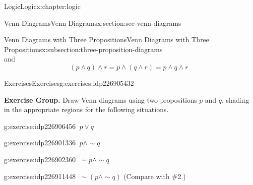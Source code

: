 \documentclass[twoside,10pt,]{book}
\numberwithin{equation}{section}
\begin{document}
\begin{chapterptx}{Logic}{}{Logic}{}{}{x:chapter:logic}
\begin{sectionptx}{Venn Diagrams}{}{Venn Diagrams}{}{}{x:section:sec-venn-diagrams}
\begin{subsectionptx}{Venn Diagrams with Three Propositions}{}{Venn Diagrams with Three Propositions}{}{}{x:subsection:three-proposition-diagrams}
\begin{equation*}
\end{equation*}
and%
\begin{equation*}
(p{\wedge} q){\wedge} r=p{\wedge}(q{\wedge} r)=p{\wedge} q{\wedge} r
\end{equation*}
%
\par
\begin{sidebyside}{2}{0.1}{0.1}{0}%
\begin{sbspanel}{0.4}%
%
\end{sbspanel}%
\begin{sbspanel}{0.4}%
%
\end{sbspanel}%
\end{sidebyside}%
%
\end{subsectionptx}
%
%
\typeout{************************************************}
\typeout{************************************************}
%
\begin{exercises-subsection}{Exercises}{}{Exercises}{}{}{g:exercises:idp226905432}
\par\medskip\noindent%
\textbf{Exercise Group.}\space\space%
Draw Venn diagrams using two propositions \(p\) and \(q\), shading in the appropriate regions for the following situations.\begin{exercisegroup}
\begin{divisionexerciseeg}{1}{}{}{g:exercise:idp226906456}%
\(\ p{\vee} q\)\end{divisionexerciseeg}%
\begin{divisionexerciseeg}{2}{}{}{g:exercise:idp226901336}%
\(\ p{\wedge} \sim\!{q}\)\end{divisionexerciseeg}%
\begin{divisionexerciseeg}{3}{}{}{g:exercise:idp226902360}%
\(\ \sim\!{p}{\wedge} \sim\!{q}\)\end{divisionexerciseeg}%
\begin{divisionexerciseeg}{4}{}{}{g:exercise:idp226911448}%
\(\ \sim\!(p{\wedge} \sim\!{q})\) (Compare with \#2.)\end{divisionexerciseeg}%

\end{exercisegroup}
\end{exercises-subsection}
\end{sectionptx}
\end{chapterptx}
\end{document}
